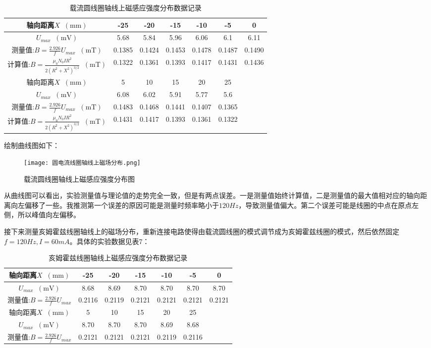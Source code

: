 \documentclass[11pt]{article}
\newcommand*{\unit}[1]{\mathop{}\!\mathrm{#1}}
\begin{document}
\begin{table}[H]
  \centering
  \caption{载流圆线圈轴线上磁感应强度分布数据记录}
  \begin{tabular}{|c|c|c|c|c|c|c|}
      \hline
      轴向距离$X\unit{(mm)}$&-25&-20&-15&-10&-5&0\\
      \hline
      $U_{max}\unit{(mV)}$&5.68  & 5.84  & 5.96  & 6.06  & 6.1   & 6.11 \\ \hline
      测量值:$B = \frac{2.926}{f} U_{max} \unit{(mT)}$&0.1385  & 0.1424  & 0.1453  & 0.1478  & 0.1487  & 0.1490\\ \hline
      计算值:$B = \frac{\mu_0 N_0 IR^2}{2(R^2 + X^2)^{3/2}} \unit{(mT)}$&0.1322  & 0.1361  & 0.1393  & 0.1417  & 0.1431  & 0.1436  \\ \hline
      轴向距离$X\unit{(mm)}$&5&10&15&20&25&\\ \hline
      $U_{max}\unit{(mV)}$&6.08  & 6.02  & 5.91  & 5.77  & 5.6 &\\ \hline
      测量值:$B = \frac{2.926}{f} U_{max} \unit{(mT)}$&0.1483  & 0.1468  & 0.1441  & 0.1407  & 0.1365&\\ \hline
      计算值:$B = \frac{\mu_0 N_0 IR^2}{2(R^2 + X^2)^{3/2}} \unit{(mT)}$&0.1431  & 0.1417  & 0.1393  & 0.1361  & 0.1322&\\ \hline
  \end{tabular}
\end{table}

绘制曲线图如下：

\begin{figure}[H]
  \centering
  \texttt{[image: 圆电流线圈轴线上磁场分布.png]}
  \caption{载流圆线圈轴线上磁感应强度分布图}
\end{figure}

从曲线图可以看出，实验测量值与理论值的走势完全一致，但是有两点误差。一是测量值始终计算值，二是测量值的最大值相对应的轴向距离向左偏移了一些。我推测第一个误差的原因可能是测量时频率略小于$120Hz$，导致测量值偏大。第二个误差可能是线圈的中点在原点左侧，所以峰值向左偏移。

接下来测量亥姆霍兹线圈轴线上的磁场分布，重新连接电路使得由载流圆线圈的模式调节成为亥姆霍兹线圈的模式，然后依然固定$f = 120Hz, I = 60mA$。具体的实验数据见表7：

\begin{table}[H]
  \centering
  \caption{亥姆霍兹线圈轴线上磁感应强度分布数据记录}
  \begin{tabular}{|c|c|c|c|c|c|c|}
      \hline
      轴向距离$X\unit{(mm)}$&-25&-20&-15&-10&-5&0\\ \hline
      $U_{max}\unit{(mV)}$&8.68  & 8.69  & 8.70  & 8.70  & 8.70  & 8.70  \\ \hline
      测量值:$B = \frac{2.926}{f} U_{max}$&0.2116  & 0.2119  & 0.2121  & 0.2121  & 0.2121  & 0.2121  \\ \hline
      轴向距离$X\unit{(mm)}$&5&10&15&20&25&\\ \hline
      $U_{max}\unit{(mV)}$&8.70  & 8.70  & 8.70  & 8.69  & 8.68  &\\ \hline
      测量值:$B = \frac{2.926}{f} U_{max}$&0.2121  & 0.2121  & 0.2121  & 0.2119  & 0.2116  &\\ \hline
  \end{tabular}
\end{table}
\end{document}

